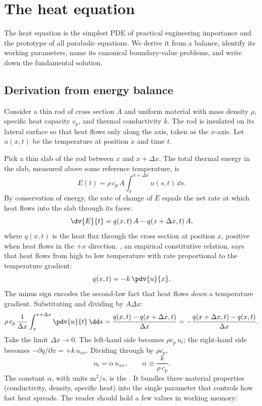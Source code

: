 \section{The heat equation}

The heat equation is the simplest PDE of practical engineering
importance and the prototype of all parabolic equations. We derive
it from a balance, identify its working parameters, name its
canonical boundary-value problems, and write down the
fundamental solution.

\subsection{Derivation from energy balance}

Consider a thin rod of cross section $A$ and uniform material with
mass density $\rho$, specific heat capacity $c_{p}$, and thermal
conductivity $k$. The rod is insulated on its lateral surface so
that heat flows only along the axis, taken as the $x$-axis. Let
$u(x, t)$ be the temperature at position $x$ and time $t$.

Pick a thin slab of the rod between $x$ and $x + \Delta x$. The
total thermal energy in the slab, measured above some reference
temperature, is
\[
E(t) = \rho\, c_{p}\, A \int_{x}^{x + \Delta x} u(s, t)\, \dd s.
\]
By conservation of energy, the rate of change of $E$ equals the
net rate at which heat flows into the slab through its faces:
\[
\dv{E}{t} = q(x, t)\, A - q(x + \Delta x, t)\, A,
\]
where $q(x, t)$ is the heat flux through the cross section at
position $x$, positive when heat flows in the $+x$ direction.
, an empirical
constitutive relation, says that heat flows from high to low
temperature with rate proportional to the temperature gradient:
\[
q(x, t) = -k\, \pdv{u}{x}.
\]
The minus sign encodes the second-law fact that heat flows
\textit{down} a temperature gradient. Substituting and dividing
by $A \Delta x$:
\[
\rho\, c_{p}\, \frac{1}{\Delta x}\int_{x}^{x + \Delta x} \pdv{u}{t}\, \dd s = \frac{q(x, t) - q(x + \Delta x, t)}{\Delta x} = -\frac{q(x + \Delta x, t) - q(x, t)}{\Delta x}.
\]
Take the limit $\Delta x \to 0$. The left-hand side becomes
$\rho c_{p}\, u_{t}$; the right-hand side becomes $-\partial q /
\partial x = +k\, u_{xx}$. Dividing through by $\rho c_{p}$,
\[
\boxed{u_{t} = \alpha\, u_{xx}, \qquad \alpha \equiv \frac{k}{\rho\, c_{p}}.}
\]
The constant $\alpha$, with units $\si{\meter\squared\per\second}$,
is the . It bundles three material
properties (conductivity, density, specific heat) into the single
parameter that controls how fast heat spreads. The reader should
hold a few values in working memory:

